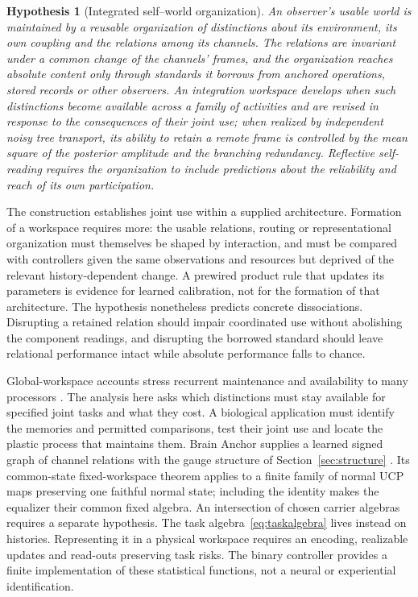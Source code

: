 \documentclass[11pt,a4paper]{article}
\newtheorem{hypothesis}[definition]{Hypothesis}
\begin{document}
\begin{hypothesis}[Integrated self--world organization]\label{hyp:integration}
An observer's usable world is maintained by a reusable organization of distinctions about its environment, its own coupling and the relations among its channels. The relations are invariant under a common change of the channels' frames, and the organization reaches absolute content only through standards it borrows from anchored operations, stored records or other observers. An integration workspace develops when such distinctions become available across a family of activities and are revised in response to the consequences of their joint use; when realized by independent noisy tree transport, its ability to retain a remote frame is controlled by the mean square of the posterior amplitude and the branching redundancy. Reflective self-reading requires the organization to include predictions about the reliability and reach of its own participation.
\end{hypothesis}

The construction establishes joint use within a supplied architecture. Formation of a workspace requires more: the usable relations, routing or representational organization must themselves be shaped by interaction, and must be compared with controllers given the same observations and resources but deprived of the relevant history-dependent change. A prewired product rule that updates its parameters is evidence for learned calibration, not for the formation of that architecture. The hypothesis nonetheless predicts concrete dissociations. Disrupting a retained relation should impair coordinated use without abolishing the component readings, and disrupting the borrowed standard should leave relational performance intact while absolute performance falls to chance.

Global-workspace accounts stress recurrent maintenance and availability to many processors \cite{DehaeneChangeux2011}. The analysis here asks which distinctions must stay available for specified joint tasks and what they cost. A biological application must identify the memories and permitted comparisons, test their joint use and locate the plastic process that maintains them. Brain Anchor supplies a learned signed graph of channel relations with the gauge structure of Section~\ref{sec:structure} \cite{BrainAnchor}. Its common-state fixed-workspace theorem applies to a finite family of normal UCP maps preserving one faithful normal state; including the identity makes the equalizer their common fixed algebra. An intersection of chosen carrier algebras requires a separate hypothesis. The task algebra~\eqref{eq:taskalgebra} lives instead on histories. Representing it in a physical workspace requires an encoding, realizable updates and read-outs preserving task risks. The binary controller provides a finite implementation of these statistical functions, not a neural or experiential identification.
\end{document}
